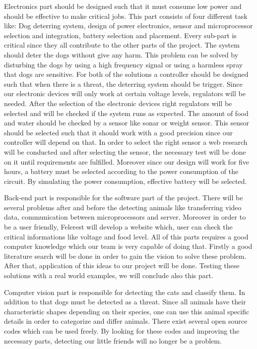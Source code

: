 Electronics part should be designed such that it must consume low power and should be effective to make critical jobs. This part consists of four different task like: Dog deterring system, design of power electronics, sensor and microprocessor selection and integration, battery selection and placement. Every sub-part is critical since they all contribute to the other parts of the project. The system should deter the dogs without give any harm. This problem can be solved by disturbing the dogs by using a high frequency signal \cite{cite:Dogrepellingdetterent} or using a harmless spray \cite{cite:Dogrepellingsprey}  that dogs are sensitive. For both of the solutions a controller should be designed such that when there is a threat, the deterring system should be trigger. Since our electronic devices will only work at certain voltage levels, regulators will be needed. After the selection of the electronic devices right regulators will be selected and will be checked if the system runs as expected.  The amount of food and water should be checked by a sensor like sonar or weight sensor. This sensor should be selected such that it should work with a good precision since our controller will depend on that. In order to select the right sensor a web research will be conducted and after selecting the sensor, the necessary test will be done on it until requirements are fulfilled.
Moreover since our design will work for five hours, a battery must be selected according to the power consumption of the circuit. By simulating the power consumption, effective battery will be selected.

Back-end part is responsible for the software part of the project. There will be several problems after and before the detecting animals like transferring video data, communication between microprocessors and server. Moreover in order to be a user friendly, Felerest will develop a website which, user can check the critical informations like voltage and food level. All of this parts requires a good computer knowledge which our team is very capable of doing that. Firstly a good literature search will be done in order to gain the vision to solve these problem. After that, application of this ideas to our project will be done. Testing these solutions with a real world examples, we will conclude also this part.

Computer vision part is responsible for detecting the cats and classify them. In addition to that dogs must be detected as a threat. Since all animals have their characteristic shapes depending on their species, one can use this animal specific details in order to categorize and differ animals. There exist several open source codes which can be used freely. By looking for these codes and improving the necessary parts, detecting our little friends will no longer be a problem.
